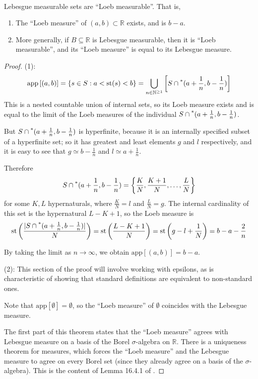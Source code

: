\documentclass[11pt]{amsart}
\theoremstyle{remark}
\newcommand{\st}{\mathrm{st}}
\newcommand{\app}[1]{\mathrm{app}\left[#1\right]}
\newcommand{\hyp}[1][\mathbb{R}]{\prescript{*}{}{#1}}
\newcommand{\near}{\simeq}
\begin{document}
\

\begin{thm} \label{thm:lebesgueimpliesloeb} Lebesgue measurable sets are ``Loeb measurable''. That is,
\begin{enumerate}
\item The ``Loeb measure'' of $(a, b) \subset \mathbb{R}$ exists, and is $b-a$.
\item More generally, if $B \subseteq \mathbb{R}$ is Lebesgue measurable, then it is ``Loeb measurable'', and its ``Loeb measure'' is equal to its Lebesgue measure.
\end{enumerate}
\end{thm}
\begin{proof}
(1): $$\app{(a, b)} = \{ s \in S : a < \st(s) < b \} = \bigcup_{n \in \mathbb{N}^{\geq 1}} \left[S \cap \hyp[(]a+\frac{1}{n}, b-\frac{1}{n}) \right]$$
This is a nested countable union of internal sets, so its Loeb measure exists and is equal to the limit of the Loeb measures of the individual $S \cap \hyp[(]a+\frac{1}{n}, b-\frac{1}{n})$.

But $S \cap \hyp[(]a+\frac{1}{n}, b-\frac{1}{n})$ is hyperfinite, because it is an internally specified subset of a hyperfinite set; so it has greatest and least elements $g$ and $l$ respectively, and it is easy to see that $g \near b-\frac{1}{n}$ and $l \near a+\frac{1}{n}$.

Therefore $$S \cap \hyp[(]a+\frac{1}{n}, b-\frac{1}{n}) = \left\{ \frac{K}{N}, \frac{K+1}{N}, \dots, \frac{L}{N} \right\}$$ for some $K, L$ hypernaturals, where $\frac{K}{N} = l$ and $\frac{L}{N} = g$.
The internal cardinality of this set is the hypernatural $L-K+1$, so the Loeb measure is $$\st \left( \frac{|S \cap \hyp[(]a+\frac{1}{n}, b-\frac{1}{n})|}{N} \right) = \st \left( \frac{L-K+1}{N} \right) = \st \left( g-l + \frac{1}{N} \right) = b-a-\frac{2}{n}$$

By taking the limit as $n \to \infty$, we obtain $\app{(a,b)} = b-a$.

(2): This section of the proof will involve working with epsilons, as is characteristic of showing that standard definitions are equivalent to non-standard ones.

Note that $\app{\emptyset} = \emptyset$, so the ``Loeb measure'' of $\emptyset$ coincides with the Lebesgue measure.

The first part of this theorem states that the ``Loeb measure'' agrees with Lebesgue measure on a basis of the Borel $\sigma$-algebra on $\mathbb{R}$.
There is a uniqueness theorem for measures, which forces the ``Loeb measure'' and the Lebesgue measure to agree on every Borel set (since they already agree on a basis of the $\sigma$-algebra).
This is the content of Lemma 16.4.1 of \cite{goldblatt}.


\end{proof}
\end{document}
